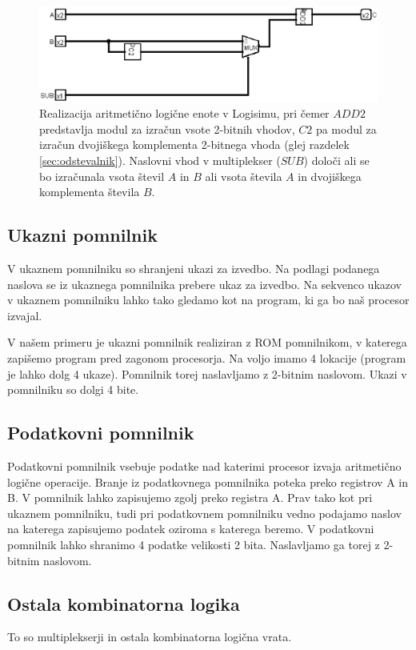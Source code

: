 \begin{figure}
\begin{center}
\includegraphics[width=0.75\columnwidth]{procesor/img/ALU}%
\caption{Realizacija aritmetično logične enote v Logisimu, pri čemer $ADD2$ predstavlja modul za izračun vsote 2-bitnih vhodov, $C2$ pa modul za izračun dvojiškega komplementa 2-bitnega vhoda (glej razdelek \ref{sec:odstevalnik}). Naslovni vhod v multiplekser ($SUB$) določi ali se bo izračunala vsota števil $A$ in $B$ ali vsota števila $A$ in dvojiškega komplementa števila $B$.}%
\label{fig:ALU}%
\end{center}
\end{figure}

\subsection{Ukazni pomnilnik}
V ukaznem pomnilniku so shranjeni ukazi za izvedbo. Na podlagi podanega naslova se iz ukaznega pomnilnika prebere ukaz za izvedbo. Na sekvenco ukazov v ukaznem pomnilniku lahko tako gledamo kot na program, ki ga bo naš procesor izvajal.

V našem primeru je ukazni pomnilnik realiziran z ROM pomnilnikom, v katerega zapišemo program pred zagonom procesorja. Na voljo imamo 4 lokacije (program je lahko dolg 4 ukaze). Pomnilnik torej naslavljamo z 2-bitnim naslovom. Ukazi v pomnilniku so dolgi 4 bite. 

\subsection{Podatkovni pomnilnik}
Podatkovni pomnilnik vsebuje podatke nad katerimi procesor izvaja aritmetično logične operacije. Branje iz podatkovnega pomnilnika poteka preko registrov A in B. V pomnilnik lahko zapisujemo zgolj preko registra A. Prav tako kot pri ukaznem pomnilniku, tudi pri podatkovnem pomnilniku vedno podajamo naslov na katerega zapisujemo podatek oziroma s katerega beremo. V podatkovni pomnilnik lahko shranimo 4 podatke velikosti 2 bita. Naslavljamo ga torej z 2-bitnim naslovom.

\subsection{Ostala kombinatorna logika}
To so multiplekserji in ostala kombinatorna logična vrata.

